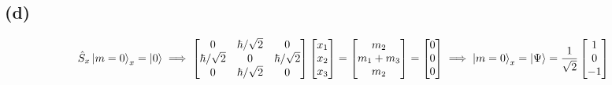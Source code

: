 \documentclass[letter, 10pts]{article}
\newcommand{\hb}{\hbar}
\begin{document}
\subsection*{(d)} 
\begin{align*}
	\hat{S}_x \ket{m = 0}_x = \ket{0} \implies 
	\begin{bmatrix} 
	0& \hb / \sqrt{2}  &  0 \\ 
\hb / \sqrt{2}  & 0 & \hb / \sqrt{2}  \\ 
0 & \hb / \sqrt{2}  & 0
\end{bmatrix} 
\begin{bmatrix} x_1 \\ x_2 \\ x_3 \end{bmatrix}  = 
\begin{bmatrix} m_2 \\ m_1 + m_3 \\ m_2 \end{bmatrix} = 
\begin{bmatrix} 0\\0\\0 \end{bmatrix} 
\implies 
\ket{m = 0}_x= \ket{\Psi} = \frac{1}{\sqrt{2} } \begin{bmatrix} 1\\0\\-1 \end{bmatrix} 
\end{align*}
\end{document}
